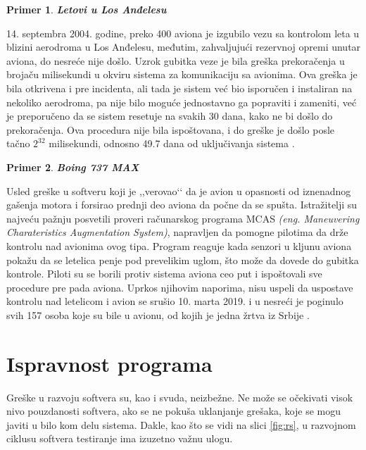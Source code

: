 \documentclass[a4paper]{article}
\newtheorem{primer}{Primer}[section]
\begin{document}
\begin{primer}
\textbf{Letovi u Los Anđelesu}
\end{primer}
14. septembra 2004. godine, preko 400 aviona je izgubilo vezu sa kontrolom leta u blizini aerodroma u Los Anđelesu, međutim, zahvaljujući rezervnoj opremi unutar aviona, do nesreće nije došlo. Uzrok gubitka veze je bila greška prekoračenja u brojaču milisekundi u okviru sistema za komunikaciju sa avionima. Ova greška je bila otkrivena i pre incidenta, ali tada je sistem već bio isporučen i instaliran na nekoliko aerodroma, pa nije bilo moguće jednostavno ga popraviti i zameniti, već je preporučeno da se sistem resetuje na svakih 30 dana, kako ne bi došlo do prekoračenja. Ova procedura nije bila ispoštovana, i do greške je došlo posle tačno $2^{32}$ milisekundi, odnosno 49.7 dana od uključivanja sistema \cite{larunway}.\\

\begin{primer}
\textbf{Boing 737 MAX}
\end{primer}
Usled greške u softveru koji je ,,verovao‘‘ da je avion u opasnosti od iznenadnog gašenja motora i forsirao prednji deo aviona da počne da se spušta. Istražitelji su najveću pažnju posvetili proveri računarskog programa MCAS \emph{(eng. Maneuvering Charateristics Augmentation System)}, napravljen da pomogne pilotima da drže kontrolu nad avionima ovog tipa. Program reaguje kada senzori u kljunu aviona pokažu da se letelica penje pod prevelikim uglom, što može da dovede do gubitka kontrole. Piloti su se borili protiv sistema aviona ceo put i ispoštovali sve procedure pre pada aviona. Uprkos njihovim naporima, nisu uspeli da uspostave kontrolu nad letelicom i avion se srušio 10. marta 2019. i u nesreći je poginulo svih 157 osoba koje su bile u avionu, od kojih je jedna žrtva iz Srbije \cite{boeing737}.\\


\section{Ispravnost programa}
\label{sec:ispravnost}
Greške u razvoju softvera su, kao i svuda, neizbežne. Ne može se očekivati visok nivo pouzdanosti softvera, ako se ne pokuša uklanjanje grešaka, koje se mogu javiti u bilo kom delu sistema. Dakle, kao što se vidi na slici \ref{fig:rs}, u razvojnom ciklusu softvera testiranje ima izuzetno važnu ulogu.
\end{document}
